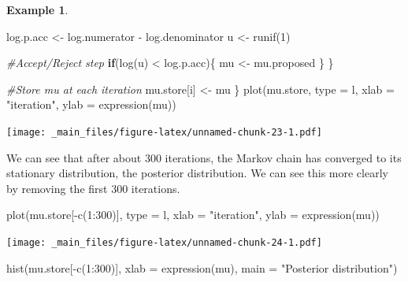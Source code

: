 \documentclass[
]{book}
\newenvironment{Shaded}{\begin{snugshade}}{\end{snugshade}}
\newcommand{\AttributeTok}[1]{\textcolor[rgb]{0.77,0.63,0.00}{#1}}
\newcommand{\CommentTok}[1]{\textcolor[rgb]{0.56,0.35,0.01}{\textit{#1}}}
\newcommand{\ControlFlowTok}[1]{\textcolor[rgb]{0.13,0.29,0.53}{\textbf{#1}}}
\newcommand{\DecValTok}[1]{\textcolor[rgb]{0.00,0.00,0.81}{#1}}
\newcommand{\FunctionTok}[1]{\textcolor[rgb]{0.00,0.00,0.00}{#1}}
\newcommand{\NormalTok}[1]{#1}
\newcommand{\OtherTok}[1]{\textcolor[rgb]{0.56,0.35,0.01}{#1}}
\newcommand{\SpecialCharTok}[1]{\textcolor[rgb]{0.00,0.00,0.00}{#1}}
\newcommand{\StringTok}[1]{\textcolor[rgb]{0.31,0.60,0.02}{#1}}
\theoremstyle{definition}
\theoremstyle{definition}
\newtheorem{example}{Example}[chapter]
\theoremstyle{definition}
\theoremstyle{definition}
\theoremstyle{remark}
\begin{document}
\begin{example}
\begin{Shaded}
\begin{Highlighting}[]
\NormalTok{    log.p.acc }\OtherTok{\textless{}{-}}\NormalTok{ log.numerator }\SpecialCharTok{{-}}\NormalTok{ log.denominator}
\NormalTok{    u }\OtherTok{\textless{}{-}} \FunctionTok{runif}\NormalTok{(}\DecValTok{1}\NormalTok{)}
    
    \CommentTok{\#Accept/Reject step}
    \ControlFlowTok{if}\NormalTok{(}\FunctionTok{log}\NormalTok{(u) }\SpecialCharTok{\textless{}}\NormalTok{ log.p.acc)\{}
\NormalTok{      mu }\OtherTok{\textless{}{-}}\NormalTok{ mu.proposed}
\NormalTok{    \}}
\NormalTok{  \}}
  
  \CommentTok{\#Store mu at each iteration}
\NormalTok{  mu.store[i] }\OtherTok{\textless{}{-}}\NormalTok{ mu}
\NormalTok{\}}
\FunctionTok{plot}\NormalTok{(mu.store, }\AttributeTok{type =} \StringTok{\textquotesingle{}l\textquotesingle{}}\NormalTok{, }\AttributeTok{xlab =} \StringTok{"iteration"}\NormalTok{, }\AttributeTok{ylab =} \FunctionTok{expression}\NormalTok{(mu))}
\end{Highlighting}
\end{Shaded}

\texttt{[image: \_main\_files/figure-latex/unnamed-chunk-23-1.pdf]}

We can see that after about 300 iterations, the Markov chain has converged to its stationary distribution, the posterior distribution. We can see this more clearly by removing the first 300 iterations.

\begin{Shaded}
\begin{Highlighting}[]
\FunctionTok{plot}\NormalTok{(mu.store[}\SpecialCharTok{{-}}\FunctionTok{c}\NormalTok{(}\DecValTok{1}\SpecialCharTok{:}\DecValTok{300}\NormalTok{)], }\AttributeTok{type =} \StringTok{\textquotesingle{}l\textquotesingle{}}\NormalTok{, }\AttributeTok{xlab =} \StringTok{"iteration"}\NormalTok{, }\AttributeTok{ylab =} \FunctionTok{expression}\NormalTok{(mu))}
\end{Highlighting}
\end{Shaded}

\texttt{[image: \_main\_files/figure-latex/unnamed-chunk-24-1.pdf]}

\begin{Shaded}
\begin{Highlighting}[]
\FunctionTok{hist}\NormalTok{(mu.store[}\SpecialCharTok{{-}}\FunctionTok{c}\NormalTok{(}\DecValTok{1}\SpecialCharTok{:}\DecValTok{300}\NormalTok{)], }\AttributeTok{xlab =} \FunctionTok{expression}\NormalTok{(mu), }\AttributeTok{main =} \StringTok{"Posterior distribution"}\NormalTok{)}
\end{Highlighting}
\end{Shaded}


\end{example}
\end{document}

